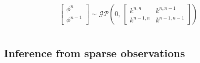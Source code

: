 \documentclass[11pt]{article}
\begin{document}
\begin{equation}
  \label{eq:joint-gp}
  \begin{bmatrix} \phi^n \\ \phi^{n-1} \end{bmatrix}
  \sim \mathcal{GP}\left(
    0,\,
    \begin{bmatrix}
      k^{n,n} & k^{n,n-1} \\
      k^{n-1,n} & k^{n-1,n-1}
    \end{bmatrix}
  \right)
\end{equation}

\begin{equation}
  \label{eq:linop}
\end{equation}
\begin{equation}
  \label{eq:blockkernels}
\end{equation}

\subsection{Inference from sparse observations}

\begin{equation}
  \label{eq:posterior}
\end{equation}

\end{document}
